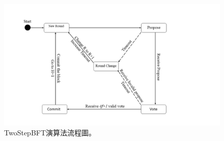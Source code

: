 \begin{figure}[!htbp]
\centering
\includegraphics[scale=0.58]{images/2.jpg}
\caption{TwoStepBFT演算法流程圖。}
\label{i:byz-latency}
\end{figure}